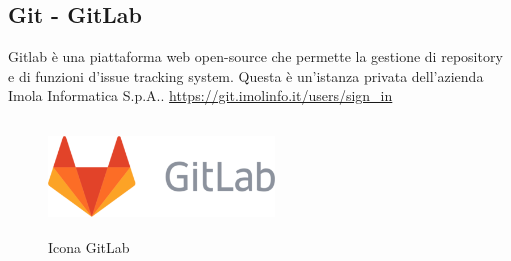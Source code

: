 \subsection*{Git - GitLab}
Gitlab è una piattaforma web open-source che permette la gestione di repository e di funzioni d'issue tracking system.
Questa è un'istanza privata dell'azienda Imola Informatica S.p.A..
\url{https://git.imolinfo.it/users/sign_in}
\begin{figure}[H]
    \centering
    \includegraphics[width=6cm, height=3cm]{./immagini/gitlab.png}
    \caption{Icona GitLab}\label{fig:gitlab}
\end{figure}
